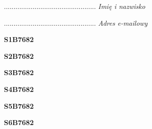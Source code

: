 \begin{turn}{90}\begin{minipage}{\linewidth} \vspace{20mm} ................................................  \textit{Imię i nazwisko}\end{minipage}\end{turn}

\begin{turn}{90}\begin{minipage}{\linewidth} \vspace{20mm} ................................................  \textit{Adres e-mailowy}\end{minipage}\end{turn}

\begin{turn}{90}\huge \begin{minipage}{\linewidth} \vspace{10mm}\textbf{S1B7682}\end{minipage}\end{turn}

\begin{turn}{90}\huge \begin{minipage}{\linewidth} \vspace{10mm}\textbf{S2B7682}\end{minipage}\end{turn}

\begin{turn}{90}\huge \begin{minipage}{\linewidth} \vspace{10mm}\textbf{S3B7682}\end{minipage}\end{turn}

\begin{turn}{90}\huge \begin{minipage}{\linewidth} \vspace{10mm}\textbf{S4B7682}\end{minipage}\end{turn}

\begin{turn}{90}\huge \begin{minipage}{\linewidth} \vspace{10mm}\textbf{S5B7682}\end{minipage}\end{turn}

\begin{turn}{90}\huge \begin{minipage}{\linewidth} \vspace{10mm}\textbf{S6B7682}\end{minipage}\end{turn}

